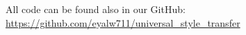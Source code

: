 All code can be found also in our GitHub: \url{https://github.com/eyalw711/universal_style_transfer}




